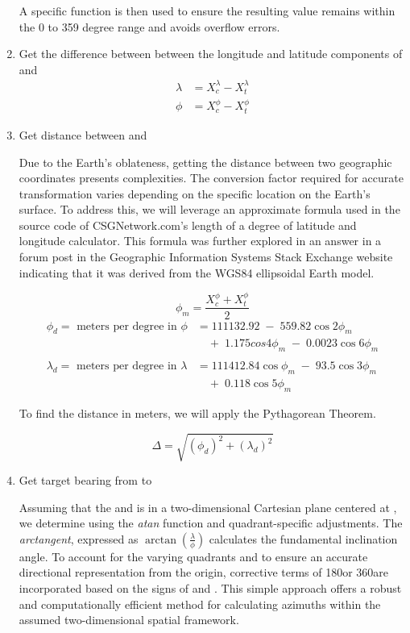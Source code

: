 \begin{enumerate}
        A specific function is then used to ensure the resulting value remains within the 0 to 359 degree range and avoids overflow errors.


  \item Get the difference between between the longitude \longDiff and latitude \latDiff components of \cLoc and \tLoc
        \begin{align*}
          \lambda & = X_c^\lambda - X_t^\lambda \\
          \phi    & = X_c^\phi - X_t^\phi
        \end{align*}

  \item Get distance \distance between \cLoc and \tLoc

        Due to the Earth's oblateness, getting the distance between two geographic coordinates presents complexities. The conversion factor required for accurate
        transformation varies depending on the specific location on the Earth's surface. To address this, we will leverage an approximate formula used in the source
        code of CSGNetwork.com's length of a degree of latitude and longitude calculator\cite{sourcecode}. This formula was further explored in an answer in a forum post in the
        Geographic Information Systems Stack Exchange website\cite{forum} indicating that it was derived from the WGS84 ellipsoidal Earth model.

        $$ \phi_m = \frac{X_c^\phi + X_t^\phi}{2} $$
        \begin{align*}
          \phi_d = \text{ meters per degree in } \phi       & = 111132.92 \; - \; 559.82\cos2{\phi_m}       \\ & \quad +  \; 1.175cos4\phi_m \; - \; 0.0023\cos6\phi_m \\ \\
          \lambda_d = \text{ meters per degree in } \lambda & = 111412.84\cos\phi_m \; - \; 93.5\cos3\phi_m \\ & \quad + \; 0.118\cos5\phi_m
        \end{align*}

        To find the distance in meters, we will apply the Pythagorean Theorem.

        $$ \Delta = \sqrt{{(\phi_d)}^2 + {(\lambda_d)}^2} $$

  \item Get target bearing \bearing from \cLoc to \tLoc

        Assuming that the \cLoc and \tLoc is in a two-dimensional Cartesian plane centered at \cLoc, we determine \bearing using the \emph{atan} function and
        quadrant-specific adjustments. The \emph{arctangent}, expressed as $\arctan(\frac{\lambda}{\phi})$ calculates the fundamental inclination angle. To account for the
        varying quadrants and to ensure an accurate directional representation from the origin, corrective terms of 180\degrees or 360\degrees are incorporated based
        on the signs of \longDiff and \latDiff. This simple approach offers a robust and computationally efficient method for calculating azimuths within the assumed two-dimensional
        spatial framework.


\end{enumerate}
